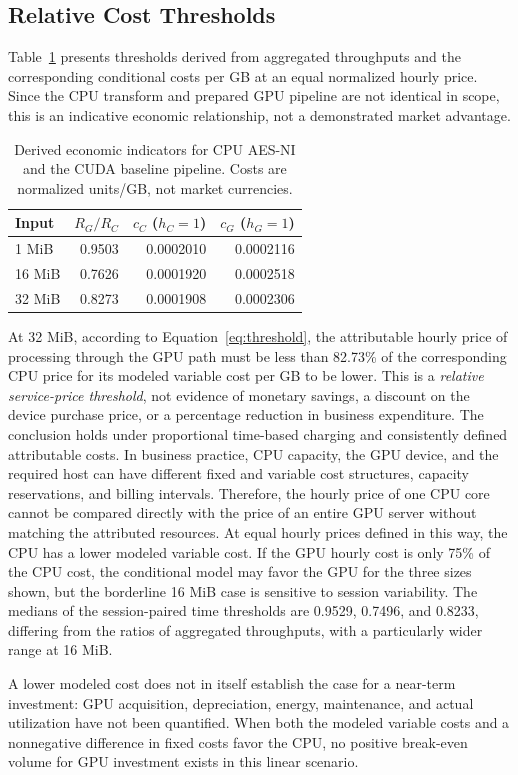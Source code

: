 \documentclass[11pt,b5paper]{article}
\begin{document}
\subsection{Relative Cost Thresholds}
Table~\ref{tab:econ} presents thresholds derived from aggregated throughputs and the corresponding conditional costs per GB at an equal normalized hourly price. Since the CPU transform and prepared GPU pipeline are not identical in scope, this is an indicative economic relationship, not a demonstrated market advantage.\par
\begin{table}[htbp]\centering\small
\caption{Derived economic indicators for CPU AES-NI and the CUDA baseline pipeline. Costs are normalized units/GB, not market currencies.}\label{tab:econ}
\begin{tabular}{lrrr}\toprule
Input & $R_G/R_C$ & $c_C$ ($h_C=1$) & $c_G$ ($h_G=1$)\\\midrule
1 MiB & 0.9503 & 0.0002010 & 0.0002116\\
16 MiB & 0.7626 & 0.0001920 & 0.0002518\\
32 MiB & 0.8273 & 0.0001908 & 0.0002306\\\bottomrule
\end{tabular}
\end{table}
At 32 MiB, according to Equation~\eqref{eq:threshold}, the attributable hourly price of processing through the GPU path must be less than 82.73\% of the corresponding CPU price for its modeled variable cost per GB to be lower. This is a \emph{relative service-price threshold}, not evidence of monetary savings, a discount on the device purchase price, or a percentage reduction in business expenditure. The conclusion holds under proportional time-based charging and consistently defined attributable costs. In business practice, CPU capacity, the GPU device, and the required host can have different fixed and variable cost structures, capacity reservations, and billing intervals. Therefore, the hourly price of one CPU core cannot be compared directly with the price of an entire GPU server without matching the attributed resources. At equal hourly prices defined in this way, the CPU has a lower modeled variable cost. If the GPU hourly cost is only 75\% of the CPU cost, the conditional model may favor the GPU for the three sizes shown, but the borderline 16 MiB case is sensitive to session variability. The medians of the session-paired time thresholds are 0.9529, 0.7496, and 0.8233, differing from the ratios of aggregated throughputs, with a particularly wider range at 16 MiB.\par
A lower modeled cost does not in itself establish the case for a near-term investment: GPU acquisition, depreciation, energy, maintenance, and actual utilization have not been quantified. When both the modeled variable costs and a nonnegative difference in fixed costs favor the CPU, no positive break-even volume for GPU investment exists in this linear scenario.
\end{document}
